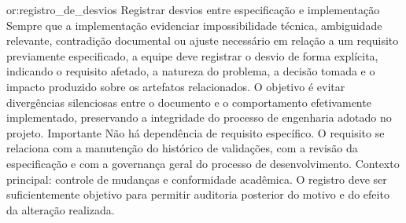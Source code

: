\reqoutro
{or:registro_de_desvios}
{Registrar desvios entre especificação e implementação}
{Sempre que a implementação evidenciar impossibilidade técnica, ambiguidade relevante, contradição documental ou ajuste necessário em relação a um requisito previamente especificado, a equipe deve registrar o desvio de forma explícita, indicando o requisito afetado, a natureza do problema, a decisão tomada e o impacto produzido sobre os artefatos relacionados. O objetivo é evitar divergências silenciosas entre o documento e o comportamento efetivamente implementado, preservando a integridade do processo de engenharia adotado no projeto.}
{Importante}
{Não há dependência de requisito específico. O requisito se relaciona com a manutenção do histórico de validações, com a revisão da especificação e com a governança geral do processo de desenvolvimento.}
{Contexto principal: controle de mudanças e conformidade acadêmica. O registro deve ser suficientemente objetivo para permitir auditoria posterior do motivo e do efeito da alteração realizada.}